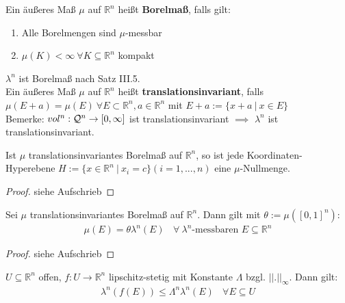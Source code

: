 
  \begin{definition}
    Ein äußeres Maß $\mu$ auf $\mathbb{R}^n$ heißt \textbf{Borelmaß}, falls gilt:
    \begin{enumerate}
      \item Alle Borelmengen sind $\mu$-messbar
      \item $\mu(K)<\infty \ \forall K \subseteq \mathbb{R}^n$ kompakt
    \end{enumerate}
  \end{definition}

  \begin{remark}
    $\lambda^n$ ist Borelmaß nach Satz III.5.\\
    Ein äußeres Maß $\mu$ auf $\mathbb{R}^n$ heißt \textbf{translationsinvariant}, falls \\
    $\mu(E + a) = \mu(E) \ \forall E \subset \mathbb{R}^n, a \in \mathbb{R}^n$ mit $E + a := \{x + a \ | \ x \in E\}$\\
    Bemerke: $vol^n:\mathcal{Q}^n \to [0, \infty]$ ist translationsinvariant $\implies$ $\lambda^n$ ist translationsinvariant.
  \end{remark}

  \begin{lemma}
    Ist $\mu$ translationsinvariantes Borelmaß auf $\mathbb{R}^n$, so ist jede Koordinaten-Hyperebene $H := \{x \in \mathbb{R}^n \ | \ x_i = c\} (i=1,...,n)$ eine $\mu$-Nullmenge.
  \end{lemma}

  \begin{proof}
    siehe Aufschrieb
  \end{proof}

  \begin{theorem}
    Sei $\mu$ translationsinvariantes Borelmaß auf $\mathbb{R}^n$. Dann gilt mit $\theta := \mu([0,1]^n)$:
    \begin{align*}
      \mu(E) = \theta \lambda^n(E) \ \ \ \ \forall \ \lambda^n \text{-messbaren } E \subseteq \mathbb{R}^n
    \end{align*}
  \end{theorem}

  \begin{proof}
    siehe Aufschrieb
  \end{proof}

  \begin{lemma}
    $U \subseteq \mathbb{R}^n$ offen, $f: U \to \mathbb{R}^n$ lipschitz-stetig mit Konstante $\Lambda$ bzgl. $||.||_{\infty}$. Dann gilt:
    \begin{align*}
      \lambda^n(f(E)) \leq \Lambda^n \lambda^n(E) \ \ \ \ \forall E \subseteq U
    \end{align*}
  \end{lemma}

